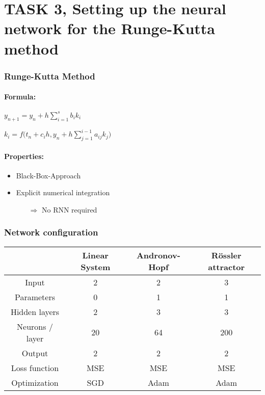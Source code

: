 \section{TASK 3, Setting up the neural network for the Runge-Kutta method}

\begin{frame}
	\frametitle{Runge-Kutta Method}
	\paragraph{Formula:}
	\quad\quad $y_{n+1} = y_n + h\sum_{i=1}^s b_i k_i$
	
	\quad\quad $k_i = f \Bigg( t_n + c_i h, y_n + h\sum_{j=1}^{i-1} a_{ij} k_j\Bigg)$
	\vspace{5mm}
	
	\paragraph{Properties:}\vspace{-2mm}
	\begin{itemize}
		\item Black-Box-Approach
		\item Explicit numerical integration
		\begin{itemize}
			\item[$\Rightarrow$] No RNN required
		\end{itemize}
	\end{itemize}
\end{frame}

\begin{frame}
	\frametitle{Network configuration}
	\centering
	\begin{tabular} { c | c | c | c}
		& Linear System & Andronov-Hopf & R\"ossler attractor	\\
		\hline
		Input			& 2 		& 2			& 3			\\
		\hline
		Parameters		& 0			& 1			& 1			\\
		\hline
		Hidden layers	& 2			& 3			& 3			\\
		\hline
		Neurons / layer	& 20		& 64		& 200		\\
		\hline
		Output			& 2			& 2			& 2			\\
		\hline
		Loss function	& MSE		& MSE		& MSE		\\
		\hline
		Optimization	& SGD		& Adam		& Adam		\\
	\end{tabular}
\end{frame}
